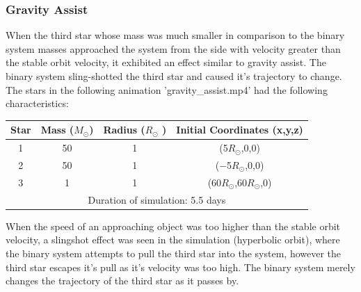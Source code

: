 \documentclass[10pt,letterpaper]{article}
\begin{document}
\subsubsection{Gravity Assist}
When the third star whose mass was much smaller in comparison to the binary system masses approached the system from the side with velocity greater than the stable orbit velocity, it exhibited an effect similar to gravity assist. The binary system sling-shotted the third star and caused it's trajectory to change. The stars in the following animation 'gravity\_assist.mp4' had the following characteristics:
\begin{table}[!htb]
\centering
\begin{tabular}{| c | c | c | c |}
\hline
Star & Mass ($M_{\odot}$) & Radius ($R_{\odot}$ ) & Initial Coordinates (x,y,z)\\
\hline
1 & 50 & 1 & (5$R_{\odot}$,0,0) \\
\hline
2 & 50 & 1 & ($-$5$R_{\odot}$,0,0) \\
\hline 
3 & 1 & 1 & (60$R_{\odot}$,60$R_{\odot}$,0) \\
\hline
\multicolumn{4}{|c|}{Duration of simulation: 5.5 days} \\
\hline
\end{tabular}
\end{table}
When the speed of an approaching object was too higher than the stable orbit velocity, a slingshot effect was seen in the simulation (hyperbolic orbit), where the binary system attempts to pull the third star into the system, however the third star escapes it's pull as it's velocity was too high. The binary system merely changes the trajectory of the third star as it passes by.
\end{document}
